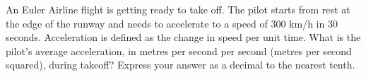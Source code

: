 An Euler Airline flight is getting ready to take off. The pilot starts from rest at the edge of the runway and needs to accelerate to a speed of $300$ km/h in $30$ seconds. Acceleration is defined as the change in speed per unit time. What is the pilot's average acceleration, in metres per second per second (metres per second squared), during takeoff? Express your answer as a decimal to the nearest tenth.
